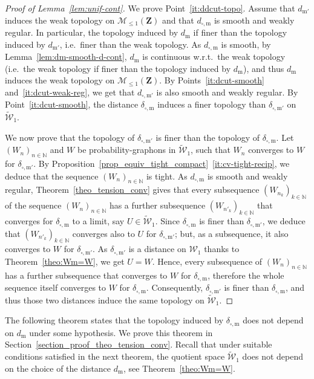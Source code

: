 \documentclass{amsart}
\newcommand{\wrt}{w.r.t.\ }
\newcommand{\ie}{i.e.\ }
\theoremstyle{plain}
\theoremstyle{definition}
\newcommand{\Space}{\mathbf{Z}}
\newcommand{\SubProba}{\mathcal{M}_{\leq1}(\Space)}
\newcommand{\Graphon}{\mathcal{W}_1}
\newcommand{\UGraphon}{\widetilde{\mathcal{W}}_1}
\newcommand{\m}{\mathrm{m}}
\newcommand{\dmeas}{d_\m}
\newcommand{\dcut}{d_{\square,\m}}
\newcommand{\ddcut}{\delta_{\square,\m}}
\newcommand{\mPrime}{\mathrm{m'}}
\newcommand{\dmeasPrime}{d_{\mPrime}}
\newcommand{\dcutPrime}{d_{\square,\mPrime}}
\newcommand{\ddcutPrime}{\delta_{\square,\mPrime}}
\newcommand{\N}{\mathbb{N}}
\begin{document}
\begin{proof}[Proof of Lemma~\ref{lem:unif-cont}]
\medskip

We prove  Point~\ref{it:ddcut-topo}.  Assume that  $\dmeasPrime$ induces
the weak topology on $\SubProba$ and that $\dcut$ is smooth and weakly regular.
In particular, the topology induced by $\dmeas$ if finer than the topology
	induced by $\dmeasPrime$, \ie finer than the weak topology.
As $\dcut$ is smooth, by Lemma~\ref{lem:dm-smooth-d-cont},
	$\dmeas$ is continuous \wrt the weak topology
	(\ie the weak topology if finer than the topology induced by $\dmeas$),
	and thus $\dmeas$ induces the weak topology on $\SubProba$.
By  Points~\ref{it:dcut-smooth}
and~\ref{it:dcut-weak-reg}, we  get that $\dcutPrime$ is  also smooth
and weakly regular. By Point~\ref{it:dcut-smooth}, the distance $\ddcut$
induces a finer topology than $\ddcutPrime$ on $\UGraphon$.

We  now prove  that  the topology  of $\ddcutPrime$  is  finer than  the
topology of  $\ddcut$. Let  $(W_n )_{n\in\N}$  and $W$  be probability-graphons  
in  $\UGraphon$,   such  that  $W_n$  converges   to  $W$  for
$\ddcutPrime$.  By
Proposition~\ref{prop_equiv_tight_compact}~\ref{it:cv-tight-recip}, we
deduce that  the sequence $(W_n)_{n\in \N}$ is tight.  
As $\dcut$ is smooth  and weakly regular,
Theorem~\ref{theo_tension_conv}    gives    that    every    subsequence
$(W_{n_k}  )_{k\in\N}$  of  the sequence $(W_n  )_{n\in\N}$ 
has  a  further subsequence $(W_{n'_k}  )_{k\in\N}$  that converges   for
$\ddcut$ to a limit, say  $U\in\UGraphon$.  Since  $\ddcut$ is finer  than $\ddcutPrime$, we  deduce that
$(W_{n'_k}  )_{k\in\N}$ converges also  to $U$ for $\ddcutPrime$;  but, as
a  subsequence, it   also  converges  to  $W$  for  $\ddcutPrime$.   As
$\ddcutPrime$    is    a    distance    on    $\Graphon$    thanks    to
Theorem~\ref{theo:Wm=W},  we get  $U=W$.   Hence,  every subsequence  of
$(W_n  )_{n\in\N}$  has a  further subsequence that  converges  to $W$  for
$\ddcut$, therefore the whole sequence itself converges to  $W$ for $\ddcut$.
Consequently,  $\ddcutPrime$ is  finer  than $\ddcut$, and thus those  two
distances induce the same topology on $\UGraphon$.
\end{proof}


The following theorem states that  the topology induced by $\ddcut$ does
not depend on $\dmeas$ under some hypothesis.  We prove this theorem
in  Section~\ref{section_proof_theo_tension_conv}.   Recall  that  under
suitable  conditions satisfied  in the  next theorem,  the  quotient
space  $\UGraphon$  does  not  depend  on the  choice  of  the  distance
$\dmeas$, see Theorem~\ref{theo:Wm=W}. 
\end{document}
